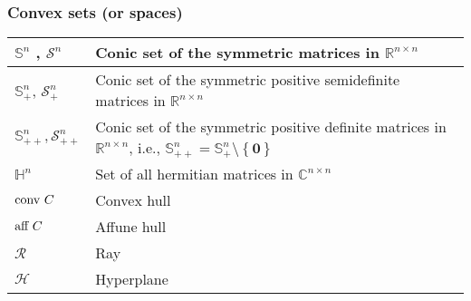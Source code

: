 \documentclass{article}
\begin{document}
\subsubsection{Convex sets (or spaces)}
\begin{xltabular}{\textwidth}{XX}
	\(\mathbb{S}^{n}\) \cite{dattorroConvexOptimizationEuclidean2010}, \(\mathcal{S}^{n}\) \cite{boydConvexOptimization2004}           & Conic set of the symmetric matrices in \(\mathbb{R}^{n\times n}\)                         \\ \hline
	\(\mathbb{S}_{+}^{n}\), \(\mathcal{S}_{+}^{n}\)   & Conic set of the symmetric positive semidefinite matrices in \(\mathbb{R}^{n\times n}\) \cite{boydConvexOptimization2004}                                                                                      \\ \hline
	\(\mathbb{S}_{++}^{n}, \mathcal{S}_{++}^{n}\) & Conic set of the symmetric positive definite matrices in \(\mathbb{R}^{n\times n}\), i.e., \(\mathbb{S}_{++}^{n} = \mathbb{S}_{+}^{n}\setminus \left\{ \mathbf{0} \right\}\) \cite{boydConvexOptimization2004} \\ \hline
	\(\mathbb{H}^{n}\)                            & Set of all hermitian matrices in \(\mathbb{C}^{n\times n}\)                                                                                                                                                    \\ \hline
	\(\textnormal{conv } C\)                      & Convex hull                                                                                                                                                                                                    \\ \hline
	\(\textnormal{aff } C\)                       & Affune hull                                                                                                                                                                                                    \\ \hline
	\(\mathcal{R}\)                               & Ray                                                                                                                                                                                                            \\ \hline
	\(\mathcal{H}\)                               & Hyperplane                                                                                                                                                                                                     \\ \hline

\end{xltabular}
\end{document}
